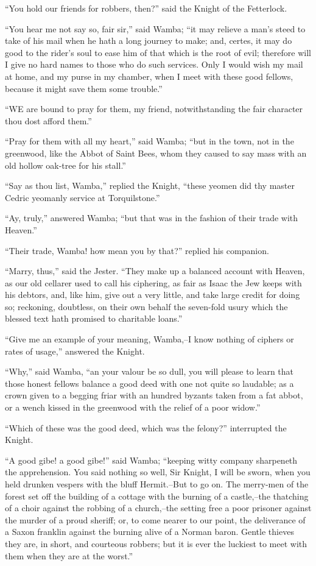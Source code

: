 ``You hold our friends for robbers, then?'' said the Knight of the
Fetterlock.

``You hear me not say so, fair sir,'' said Wamba; ``it may relieve a
man's steed to take of his mail when he hath a long journey to make;
and, certes, it may do good to the rider's soul to ease him of that
which is the root of evil; therefore will I give no hard names to those
who do such services. Only I would wish my mail at home, and my purse in
my chamber, when I meet with these good fellows, because it might save
them some trouble.''

``WE are bound to pray for them, my friend, notwithstanding the fair
character thou dost afford them.''

``Pray for them with all my heart,'' said Wamba; ``but in the town, not
in the greenwood, like the Abbot of Saint Bees, whom they caused to say
mass with an old hollow oak-tree for his stall.''

``Say as thou list, Wamba,'' replied the Knight, ``these yeomen did thy
master Cedric yeomanly service at Torquilstone.''

``Ay, truly,'' answered Wamba; ``but that was in the fashion of their
trade with Heaven.''

``Their trade, Wamba! how mean you by that?'' replied his companion.

``Marry, thus,'' said the Jester. ``They make up a balanced account with
Heaven, as our old cellarer used to call his ciphering, as fair as Isaac
the Jew keeps with his debtors, and, like him, give out a very little,
and take large credit for doing so; reckoning, doubtless, on their own
behalf the seven-fold usury which the blessed text hath promised to
charitable loans.''

``Give me an example of your meaning, Wamba,--I know nothing of ciphers
or rates of usage,'' answered the Knight.

``Why,'' said Wamba, ``an your valour be so dull, you will please to
learn that those honest fellows balance a good deed with one not quite
so laudable; as a crown given to a begging friar with an hundred byzants
taken from a fat abbot, or a wench kissed in the greenwood with the
relief of a poor widow.''

``Which of these was the good deed, which was the felony?'' interrupted
the Knight.

``A good gibe! a good gibe!'' said Wamba; ``keeping witty company
sharpeneth the apprehension. You said nothing so well, Sir Knight, I
will be sworn, when you held drunken vespers with the bluff Hermit.--But
to go on. The merry-men of the forest set off the building of a cottage
with the burning of a castle,--the thatching of a choir against the
robbing of a church,--the setting free a poor prisoner against the
murder of a proud sheriff; or, to come nearer to our point, the
deliverance of a Saxon franklin against the burning alive of a Norman
baron. Gentle thieves they are, in short, and courteous robbers; but it
is ever the luckiest to meet with them when they are at the worst.''

